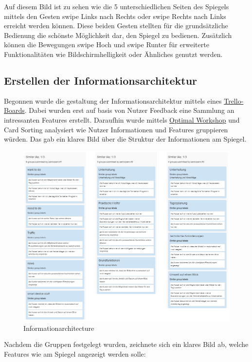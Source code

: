 \documentclass[12pt, a4paper]{scrartcl}
\begin{document}
	Auf diesem Bild ist zu sehen wie die 5 unterschiedlichen Seiten des Spiegels mittels den Gesten swipe Links nach Rechts oder swipe Rechts nach Links erreicht werden können.
	Diese beiden Gesten stellten für die grundsätzliche Bedienung die schönste Möglichkeit dar, den Spiegel zu bedienen. Zusätzlich können die Bewegungen swipe Hoch und swipe Runter für erweiterte Funktionalitäten wie Bildschirmhelligkeit oder Ähnliches genutzt werden.
	
	\subsection{Erstellen der Informationsarchitektur}
	Begonnen wurde die gestaltung der Informationsarchitektur mittels eines \href{https://trello.com/b/hdf8bWp2/sippin-on-my-lean-ux}{Trello-Boards}. Dabei wurden erst auf basis von Nutzer Feedback eine Sammlung an intressanten Features erstellt. Daraufhin wurde mittels \href{https://www.optimalworkshop.com/optimalsort/}{Optimal Workshop} und Card Sorting analysiert wie Nutzer Informationen und Features gruppieren würden. Das gab ein klares Bild über die Struktur der Informationen am Spiegel.
	\begin{figure}[h!]
		\centering
		\includegraphics[width=\textwidth]{img/IA.png}
		\captionsetup{labelformat=empty}
		\caption{Informationarchitecture}
	\end{figure}
	\newpage
	Nachdem die Gruppen festgelegt wurden, zeichnete sich ein klares Bild ab, welche Features wie am Spiegel angezeigt werden solle:
\end{document}
